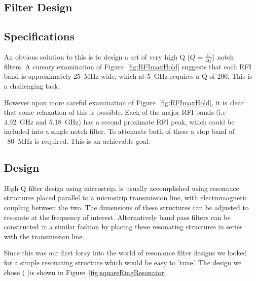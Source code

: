 \clearpage


\subsection{Filter Design}

\subsection{Specifications}
An obvious solution to this is to design a set of very high Q ($Q=\frac{f_{c}}{\Delta f}$) notch filters. A cursory examination of Figure~\ref{fig:RFImaxHold} suggests that each RFI band is approximately 25~MHz wide, which at 5~GHz requires a Q of 200. This is a challenging task.

However upon more careful examination of Figure~\ref{fig:RFImaxHold}, it is clear that some relaxation of this is possible. Each of the major RFI bands (i.e 4.92~GHz and 5.18~GHz) has a second proximate RFI peak, which could be included into a single notch filter. To attenuate both of these a stop band of ~80~MHz is required. This is an achievable goal.

\subsection{Design}

High Q filter design using microstrip, is usually accomplished using resonance structures placed parallel to a microstrip transmission line, with electromagnetic coupling between the two. The dimensions of these structures can be adjusted to resonate at the frequency of interest. Alternatively band pass filters can be constructed in a similar fashion by placing these resonating structures in series with the transmission line.

Since this was our first foray into the world of resonance filter designs we looked for a simple resonating structure which would be easy to 'tune'. The design we chose (\cite{splitRingClassic} )is shown in Figure~\ref{fig:squareRingResonator}.

